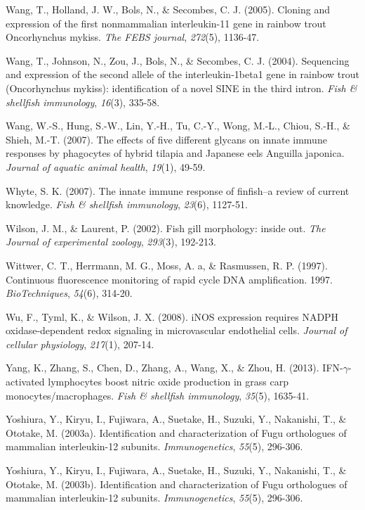 \documentclass[12pt,letterpaper,oneside]{scrbook}
\begin{document}
Wang, T., Holland, J. W., Bols, N., \& Secombes, C. J. (2005). Cloning
and expression of the first nonmammalian interleukin-11 gene in rainbow
trout Oncorhynchus mykiss. \emph{The FEBS journal}, \emph{272}(5),
1136-47.

Wang, T., Johnson, N., Zou, J., Bols, N., \& Secombes, C. J. (2004).
Sequencing and expression of the second allele of the interleukin-1beta1
gene in rainbow trout (Oncorhynchus mykiss): identification of a novel
SINE in the third intron. \emph{Fish \& shellfish immunology},
\emph{16}(3), 335-58.

Wang, W.-S., Hung, S.-W., Lin, Y.-H., Tu, C.-Y., Wong, M.-L., Chiou,
S.-H., \& Shieh, M.-T. (2007). The effects of five different glycans on
innate immune responses by phagocytes of hybrid tilapia and Japanese
eels Anguilla japonica. \emph{Journal of aquatic animal health},
\emph{19}(1), 49-59.

Whyte, S. K. (2007). The innate immune response of finfish--a review of
current knowledge. \emph{Fish \& shellfish immunology}, \emph{23}(6),
1127-51.

Wilson, J. M., \& Laurent, P. (2002). Fish gill morphology: inside out.
\emph{The Journal of experimental zoology}, \emph{293}(3), 192-213.

Wittwer, C. T., Herrmann, M. G., Moss, A. a, \& Rasmussen, R. P. (1997).
Continuous fluorescence monitoring of rapid cycle DNA amplification.
1997. \emph{BioTechniques}, \emph{54}(6), 314-20.

Wu, F., Tyml, K., \& Wilson, J. X. (2008). iNOS expression requires
NADPH oxidase-dependent redox signaling in microvascular endothelial
cells. \emph{Journal of cellular physiology}, \emph{217}(1), 207-14.

Yang, K., Zhang, S., Chen, D., Zhang, A., Wang, X., \& Zhou, H. (2013).
IFN-\(\gamma\)-activated lymphocytes boost nitric oxide production in
grass carp monocytes/macrophages. \emph{Fish \& shellfish immunology},
\emph{35}(5), 1635-41.

Yoshiura, Y., Kiryu, I., Fujiwara, A., Suetake, H., Suzuki, Y.,
Nakanishi, T., \& Ototake, M. (2003a). Identification and
characterization of Fugu orthologues of mammalian interleukin-12
subunits. \emph{Immunogenetics}, \emph{55}(5), 296-306.

Yoshiura, Y., Kiryu, I., Fujiwara, A., Suetake, H., Suzuki, Y.,
Nakanishi, T., \& Ototake, M. (2003b). Identification and
characterization of Fugu orthologues of mammalian interleukin-12
subunits. \emph{Immunogenetics}, \emph{55}(5), 296-306.
\end{document}
